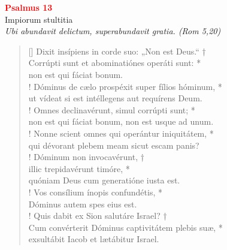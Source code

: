 


\def\greinitialformat#1{%
{\fontsize{39}{39}\selectfont #1}%
}




\vspace{0.3cm}
\begin{center}
 \textcolor{red}{\large \bf Psalmus 13}\\
Impiorum stultitia\\
\textit{\small Ubi abundavit delictum, superabundavit gratia. (Rom 5,20)}
\end{center}
\begin{verse}[\versewidth]
Dixit insípiens in corde suo: „Non est Deus.“ †\\
Corrúpti sunt et abominatiónes operáti sunt: *\\
non est qui fáciat bonum.\\!
\vin Dóminus de cælo prospéxit super fílios hóminum, *\\
\vin ut vídeat si est intéllegens aut requírens Deum.\\!
Omnes declinavérunt, simul corrúpti sunt; *\\
non est qui fáciat bonum, non est usque ad unum.\\!
\vin Nonne scient omnes qui operántur iniquitátem, *\\
\vin qui dévorant plebem meam sicut escam panis?\\!
Dóminum non invocavérunt, †\\
illic trepidavérunt timóre, *\\
quóniam Deus cum generatióne iusta est.\\!
\vin Vos consílium ínopis confundétis, *\\
\vin Dóminus autem spes eius est.\\!
Quis dabit ex Sion salutáre Israel? †\\
Cum convérterit Dóminus captivitátem plebis suæ, *\\
exsultábit Iacob et lætábitur Israel.\\
\end{verse}
\vspace{1cm}


